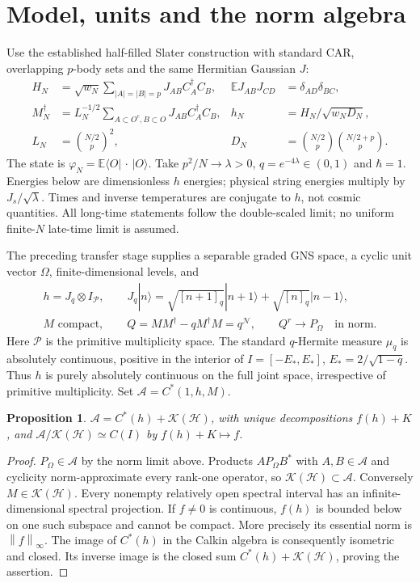 \documentclass[11pt]{article}
\newcommand{\HH}{\mathcal H}
\newcommand{\Alg}{\mathcal A}
\newcommand{\CC}{\mathcal K(\HH)}
\newcommand{\norm}[1]{\left\lVert#1\right\rVert}
\newtheorem{proposition}{Proposition}
\begin{document}
\section{Model, units and the norm algebra}
Use the established half-filled Slater construction with standard CAR,
overlapping $p$-body sets and the same Hermitian Gaussian $J$:
\begin{align}
 H_N&=\sqrt{w_N}\sum_{|A|=|B|=p}J_{AB}C_A^\dagger C_B,
 &\mathbb E J_{AB}J_{CD}&=\delta_{AD}\delta_{BC},\\
 M_N^\dagger&=L_N^{-1/2}\sum_{A\subset O^c,B\subset O}J_{AB}C_A^\dagger C_B,
 &h_N&=H_N/\sqrt{w_ND_N},\\
 L_N&=\binom{N/2}{p}^{\!2},
 &D_N&=\binom{N/2}{p}\binom{N/2+p}{p}.
\end{align}
The state is $\varphi_N=\mathbb E\langle O|\,\cdot\,|O\rangle$.
Take $p^2/N\to\lambda>0$, $q=e^{-4\lambda}\in(0,1)$ and
$\hbar=1$. Energies below are dimensionless $h$ energies; physical
string energies multiply by $J_s/\sqrt\lambda$. Times and inverse
temperatures are conjugate to $h$, not cosmic quantities. All
long-time statements follow the double-scaled limit; no uniform
finite-$N$ late-time limit is assumed.

The preceding transfer stage supplies a separable graded GNS space,
a cyclic unit vector $\Omega$, finite-dimensional levels, and
\begin{gather}
 h=J_q\otimes I_{\mathcal P},\qquad
 J_q|n\rangle=\sqrt{[n+1]_q}|n+1\rangle+
                    \sqrt{[n]_q}|n-1\rangle,\\
 M\text{ compact},\qquad Q=MM^\dagger-qM^\dagger M=q^{\mathcal N},
 \qquad Q^r\longrightarrow P_\Omega\quad\text{in norm}.
\end{gather}
Here $\mathcal P$ is the primitive multiplicity space. The standard
$q$-Hermite measure $\mu_q$ is absolutely continuous, positive in
the interior of $I=[-E_*,E_*]$, $E_*=2/\sqrt{1-q}$.
Thus $h$ is purely absolutely continuous on the full joint space,
irrespective of primitive multiplicity. Set $\Alg=C^*(1,h,M)$.

\begin{proposition}
\label{alg}
$\Alg=C^*(h)+\CC$, with unique decompositions $f(h)+K$, and
$\Alg/\CC\simeq C(I)$ by $f(h)+K\mapsto f$.
\end{proposition}
\begin{proof}
$P_\Omega\in\Alg$ by the norm limit above. Products
$A P_\Omega B^*$ with $A,B\in\Alg$ and cyclicity norm-approximate
every rank-one operator, so $\CC\subset\Alg$. Conversely $M\in\CC$.
Every nonempty relatively open spectral interval has an
infinite-dimensional spectral projection. If $f\ne0$ is continuous,
$f(h)$ is bounded below on one such subspace and cannot be compact.
More precisely its essential norm is $\norm{f}_\infty$.
The image of $C^*(h)$ in the Calkin algebra is consequently
isometric and closed. Its inverse image is the closed sum
$C^*(h)+\CC$, proving the assertion.
\end{proof}
\end{document}
